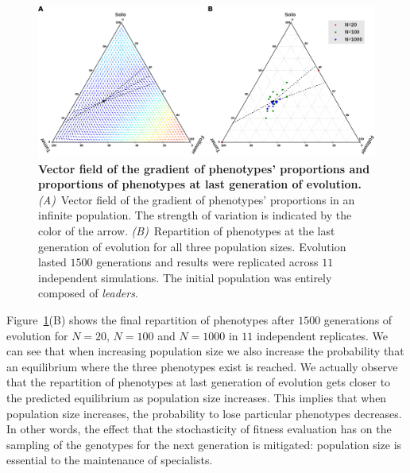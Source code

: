   \begin{figure}[ht]
    \centerfloat
      \includegraphics[scale=0.90]{fig/ArticleRob2/figExpectations.png}
    \caption{\textbf{Vector field of the gradient of phenotypes' proportions and proportions of phenotypes at last generation of evolution.} {\em (A)}~Vector field of the gradient of phenotypes' proportions in an infinite population. The strength of variation is indicated by the color of the arrow. {\em (B)}~Repartition of phenotypes at the last generation of evolution for all three population sizes. Evolution lasted $1500$ generations and results were replicated across $11$ independent simulations. The initial population was entirely composed of \emph{leaders}.}
    \label{fig:ternary}
  \end{figure}

  Figure~\ref{fig:ternary}(B) shows the final repartition of phenotypes after $1500$ generations of evolution for \(N=20\), \(N=100\) and \(N=1000\) in $11$ independent replicates. We can see that when increasing population size we also increase the probability that an equilibrium where the three phenotypes exist is reached. We actually observe that the repartition of phenotypes at last generation of evolution gets closer to the predicted equilibrium as population size increases. This implies that when population size increases, the probability to lose particular phenotypes decreases. In other words, the effect that the stochasticity of fitness evaluation has on the sampling of the genotypes for the next generation is mitigated: population size is essential to the maintenance of specialists.


